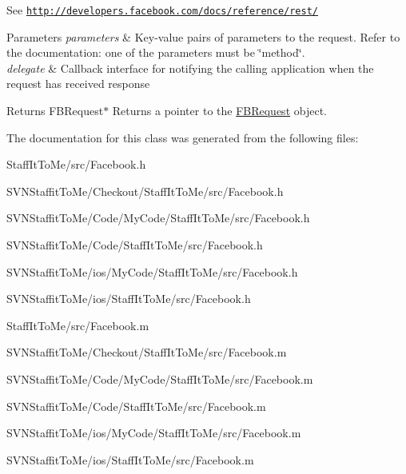 \-See \href{http://developers.facebook.com/docs/reference/rest/}{\tt http\-://developers.\-facebook.\-com/docs/reference/rest/}


\begin{DoxyParams}{\-Parameters}
{\em parameters} & \-Key-\/value pairs of parameters to the request. \-Refer to the documentation\-: one of the parameters must be \char`\"{}method\char`\"{}. \\
\hline
{\em delegate} & \-Callback interface for notifying the calling application when the request has received response \\
\hline
\end{DoxyParams}
\begin{DoxyReturn}{\-Returns}
\-F\-B\-Request$\ast$ \-Returns a pointer to the \hyperlink{interface_f_b_request}{\-F\-B\-Request} object. 
\end{DoxyReturn}


\-The documentation for this class was generated from the following files\-:\begin{DoxyCompactItemize}
\item 
\-Staff\-It\-To\-Me/src/\-Facebook.\-h\item 
\-S\-V\-N\-Staffit\-To\-Me/\-Checkout/\-Staff\-It\-To\-Me/src/\-Facebook.\-h\item 
\-S\-V\-N\-Staffit\-To\-Me/\-Code/\-My\-Code/\-Staff\-It\-To\-Me/src/\-Facebook.\-h\item 
\-S\-V\-N\-Staffit\-To\-Me/\-Code/\-Staff\-It\-To\-Me/src/\-Facebook.\-h\item 
\-S\-V\-N\-Staffit\-To\-Me/ios/\-My\-Code/\-Staff\-It\-To\-Me/src/\-Facebook.\-h\item 
\-S\-V\-N\-Staffit\-To\-Me/ios/\-Staff\-It\-To\-Me/src/\-Facebook.\-h\item 
\-Staff\-It\-To\-Me/src/\-Facebook.\-m\item 
\-S\-V\-N\-Staffit\-To\-Me/\-Checkout/\-Staff\-It\-To\-Me/src/\-Facebook.\-m\item 
\-S\-V\-N\-Staffit\-To\-Me/\-Code/\-My\-Code/\-Staff\-It\-To\-Me/src/\-Facebook.\-m\item 
\-S\-V\-N\-Staffit\-To\-Me/\-Code/\-Staff\-It\-To\-Me/src/\-Facebook.\-m\item 
\-S\-V\-N\-Staffit\-To\-Me/ios/\-My\-Code/\-Staff\-It\-To\-Me/src/\-Facebook.\-m\item 
\-S\-V\-N\-Staffit\-To\-Me/ios/\-Staff\-It\-To\-Me/src/\-Facebook.\-m\end{DoxyCompactItemize}
